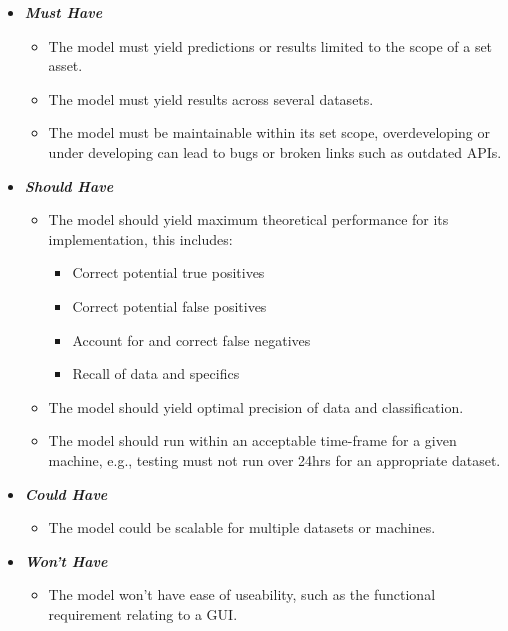 \begin{itemize}
    \item \textbf{\textit{Must Have}}
        \begin{itemize}\label{NFMH}
            \item The model must yield predictions or results limited to the scope of a set asset.
            \item The model must yield results across several datasets.
            \item The model must be maintainable within its set scope, overdeveloping or under developing can lead to bugs or broken links such as outdated APIs.
        \end{itemize}
    \item \textbf{\textit{Should Have}}
        \begin{itemize}\label{NFSH}
            \item The model should yield maximum theoretical performance for its implementation, this includes:
                \begin{itemize}
                    \item Correct potential true positives
                    \item Correct potential false positives
                    \item Account for and correct false negatives
                    \item Recall of data and specifics
                \end{itemize}
            \item The model should yield optimal precision of data and classification.
            \item The model should run within an acceptable time-frame for a given machine, e.g., testing must not run over 24hrs for an appropriate dataset.
        \end{itemize}
    \item \textbf{\textit{Could Have}}
        \begin{itemize}\label{NFCH}
            \item The model could be scalable for multiple datasets or machines.
        \end{itemize}
    \item \textbf{\textit{Won't Have}}
        \begin{itemize}\label{NFWH}
            \item The model won't have ease of useability, such as the functional requirement relating to a GUI.
        \end{itemize}
\end{itemize}

